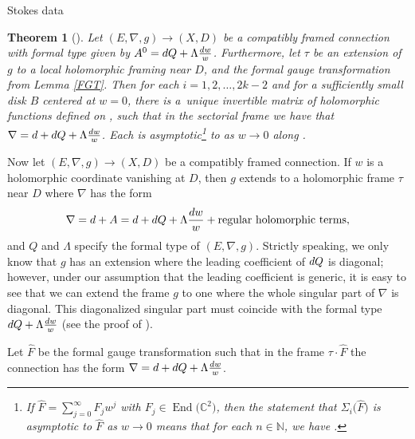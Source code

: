 \documentclass[11pt]{article}
\numberwithin{equation}{section}
\newtheorem{Theorem}{Theorem}[section]
\numberwithin{equation}{section}
\begin{document}
\begin{subsubsection}{Stokes data}
\begin{Theorem}[{\cite[Theorem 3.1]{B}}] Let $(E,\nabla,g)\to (X,D)$ be a compatibly framed connection with formal type given by $A^0={\rm d}Q+\Lambda \frac{{\rm d}w}{w}$. Furthermore, let $\tau$ be an extension of $g$ to a local holomorphic framing near $D$, and  the formal gauge transformation from Lemma {\rm\ref{FGT}}. Then for each $i=1,2,\dots ,2k-2$ and for a sufficiently small disk $B$ centered at $w=0$, there is a~unique invertible matrix  of holomorphic functions defined on , such that in the sectorial frame  we have that
$
 \nabla={\rm d} + {\rm d}Q +\Lambda \frac{{\rm d}w}{w}$.
Each  is asymptotic\footnote{If $\widehat{F}=\sum_{j=0}^{\infty}F_jw^j$ with $F_j\in \operatorname{End}\bigl(\mathbb{C}^2\bigr)$, then the statement that $\Sigma_i\bigl(\widehat{F}\bigr)$ is asymptotic to $\widehat{F}$ as $w\to 0$ means that for each $n\in \mathbb{N}$, we have .} to  as $w \to 0$ along .

\end{Theorem}


Now let $(E,\nabla,g)\to (X,D)$ be a compatibly framed connection. If $w$ is a holomorphic coordinate vanishing at $D$, then $g$ extends to a holomorphic frame $\tau$ near $D$ where $\nabla$ has the form
\begin{equation*}
 \nabla={\rm d}+A={\rm d}+ {\rm d}Q+\Lambda \frac{{\rm d}w}{w}+ \text{regular holomorphic terms},
\end{equation*}
and $Q$ and $\Lambda$ specify the formal type of $(E,\nabla,g)$. Strictly speaking, we only know that $g$ has an extension where the leading coefficient of ${\rm d}Q$ is diagonal; however, under our assumption that the leading coefficient is generic, it is easy to see that we can extend the frame $g$ to one where the whole singular part of $\nabla$ is diagonal. This diagonalized singular part must coincide with the formal type ${\rm d}Q+\Lambda \frac{{\rm d}w}{w}$ (see the proof of \cite[Lemma 1]{B2}).

Let $\widehat{F}$ be the formal gauge transformation such that in the frame $\tau \cdot \widehat{F}$ the connection has the form
$\nabla={\rm d}+{\rm d}Q+\Lambda \frac{{\rm d}w}{w}$.


\end{subsubsection}
\end{document}

